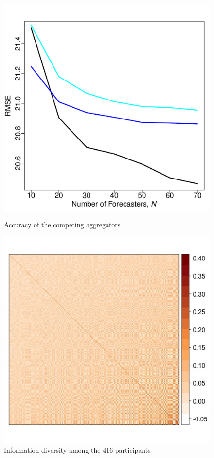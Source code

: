 \documentclass[11pt]{article}
\theoremstyle{definition}
\theoremstyle{definition}
\begin{document}
\begin{figure}[t!]
\begin{minipage}[b]{0.495\textwidth}
                \includegraphics[width=\textwidth]{PointEstimates.pdf}
                \caption{Accuracy of the competing aggregators}
                \label{pointsAcc}
        \end{minipage}%
        \begin{minipage}[b]{0.495\textwidth}
                 \includegraphics[width=\textwidth]{InfoPlotPoints.jpg}
            \caption{Information diversity among the 416 participants}
                                \label{ID416}
        \end{minipage}
\end{figure}
\end{document}
